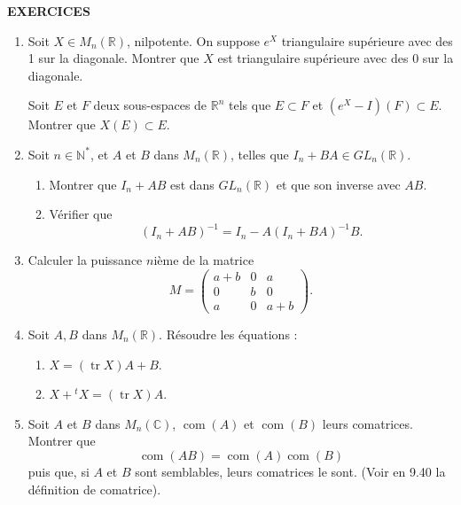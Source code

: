 
\begin{center}
{\Large\sffamily\bfseries\color{BellaLavenderDeep} EXERCICES}
\end{center}
\vspace{0.8em}

\begin{enumerate}[label=\arabic*.,leftmargin=2.2em,itemsep=1.1em]

\item Soit $X\in M_n(\mathbb R)$, nilpotente. On suppose $e^X$ triangulaire supérieure avec des 1 sur la diagonale. Montrer que $X$ est triangulaire supérieure avec des 0 sur la diagonale.

Soit $E$ et $F$ deux sous-espaces de $\mathbb R^n$ tels que $E\subset F$ et $(e^X-I)(F)\subset E$. Montrer que $X(E)\subset E$.

\item Soit $n\in\mathbb N^*$, et $A$ et $B$ dans $M_n(\mathbb R)$, telles que $I_n+BA\in GL_n(\mathbb R)$.
\begin{enumerate}[label=\alph*),leftmargin=2em]
\item Montrer que $I_n+AB$ est dans $GL_n(\mathbb R)$ et que son inverse  avec $AB$.
\item Vérifier que
\[
(I_n+AB)^{-1}=I_n-A(I_n+BA)^{-1}B.
\]
\end{enumerate}

\item Calculer la puissance $n$ième de la matrice
\[
M=\begin{pmatrix}
a+b&0&a\\0&b&0\\a&0&a+b
\end{pmatrix}.
\]

\item Soit $A,B$ dans $M_n(\mathbb R)$. Résoudre les équations :
\begin{enumerate}[label=\alph*),leftmargin=2em]
\item $X=(\operatorname{tr}X)A+B$.
\item $X+{}^tX=(\operatorname{tr}X)A$.
\end{enumerate}

\item Soit $A$ et $B$ dans $M_n(\mathbb C)$, $\operatorname{com}(A)$ et $\operatorname{com}(B)$ leurs comatrices. Montrer que
\[
\operatorname{com}(AB)=\operatorname{com}(A)\operatorname{com}(B)
\]
puis que, si $A$ et $B$ sont semblables, leurs comatrices le sont. (Voir en 9.40 la définition de comatrice).


\end{enumerate}
